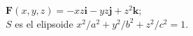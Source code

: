 \item $\mathbf{F}(x, y, z) = -xz\mathbf{i} - yz\mathbf{j} + z^2\mathbf{k}$;\\
    $S$ es el elipsoide $x^2/a^2 + y^2/b^2 + z^2/c^2 = 1$.
